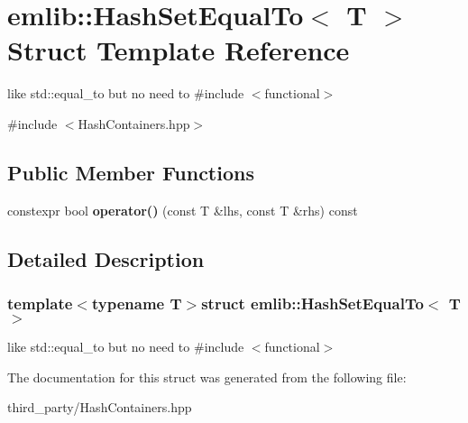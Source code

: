 \hypertarget{structemlib_1_1_hash_set_equal_to}{\section{emlib\+:\+:Hash\+Set\+Equal\+To$<$ T $>$ Struct Template Reference}
\label{structemlib_1_1_hash_set_equal_to}
}


like std\+::equal\+\_\+to but no need to {\ttfamily \#include $<$functional$>$}  




{\ttfamily \#include $<$Hash\+Containers.\+hpp$>$}

\subsection*{Public Member Functions}
\begin{DoxyCompactItemize}
\item 
\hypertarget{structemlib_1_1_hash_set_equal_to_a438796e3b163efdba4030c56f5ec9104}{constexpr bool {\bfseries operator()} (const T \&lhs, const T \&rhs) const }\label{structemlib_1_1_hash_set_equal_to_a438796e3b163efdba4030c56f5ec9104}

\end{DoxyCompactItemize}


\subsection{Detailed Description}
\subsubsection*{template$<$typename T$>$struct emlib\+::\+Hash\+Set\+Equal\+To$<$ T $>$}

like std\+::equal\+\_\+to but no need to {\ttfamily \#include $<$functional$>$} 

The documentation for this struct was generated from the following file\+:\begin{DoxyCompactItemize}
\item 
third\+\_\+party/Hash\+Containers.\+hpp\end{DoxyCompactItemize}
